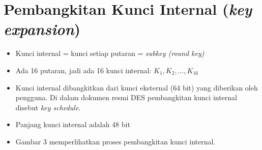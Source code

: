\documentclass{article}
\begin{document}

\section*{Pembangkitan Kunci Internal (\textit{key expansion})}

\begin{itemize}
    \item Kunci internal = kunci setiap putaran = \textit{subkey (round key)}
    \item Ada 16 putaran, jadi ada 16 kunci internal: $K_1, K_2, \dots, K_{16}$
    \item Kunci internal dibangkitkan dari kunci eksternal (64 bit) yang diberikan oleh pengguna. Di dalam dokumen resmi DES pembangkitan kunci internal disebut \textit{key schedule}.
    \item Panjang kunci internal adalah 48 bit
    \item Gambar 3 memperlihatkan proses pembangkitan kunci internal.
\end{itemize}
\end{document}
